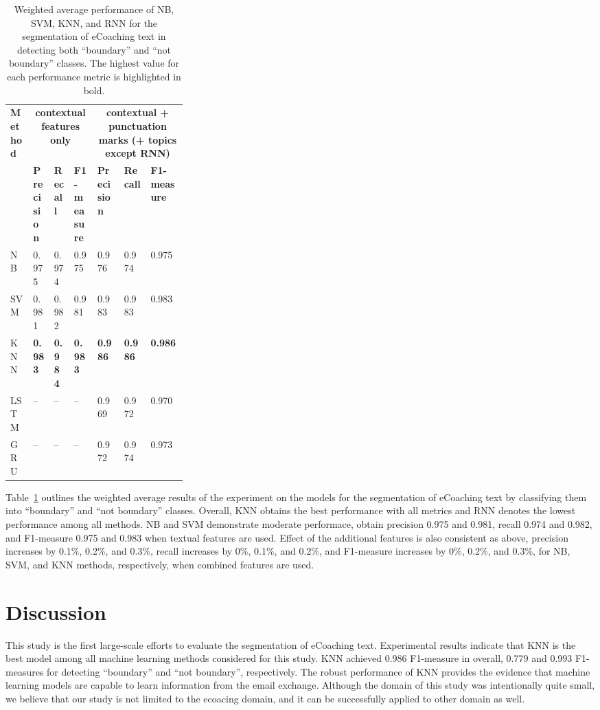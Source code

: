 \documentclass{amia}
\begin{document}
\begin{table}[ht]
\centering
\caption{Weighted average performance of NB, SVM, KNN, and RNN for the segmentation of eCoaching text in detecting both ``boundary'' and ``not boundary'' classes. The highest value for each performance metric is highlighted in bold.}
\label{tab:result_weighted_avg}
  \begin{tabular}{|l|l|l|l|p{0.15\linewidth}|p{0.15\linewidth}|l|}
  \hline
   \multirow{2}{*}{\textbf{Method}} & \multicolumn{3}{|c|}{\textbf{contextual features only}} & \multicolumn{3}{|c|}{\textbf{contextual + punctuation marks (+ topics except RNN)}} \\\cline{2-7}
   & \textbf{Precision}  & \textbf{Recall} & \textbf{F1-measure} & \textbf{Precision}  & \textbf{Recall} & \textbf{F1-measure}\\ \hline    
    
 NB & 0.975 & 0.974 & 0.975 & 0.976 & 0.974 & 0.975 \\ \hline
 SVM & 0.981 & 0.982 & 0.981 & 0.983 & 0.983 & 0.983\\ \hline
 KNN & \textbf{0.983} & \textbf{0.984} & \textbf{0.983} & \textbf{0.986} & \textbf{0.986} & \textbf{0.986}\\ \hline
 LSTM & -- & -- & -- & 0.969 & 0.972 & 0.970 \\ \hline
 GRU & -- & -- & -- & 0.972 & 0.974 & 0.973 \\ \hline 
  \end{tabular}
\end{table} 

Table~\ref{tab:result_weighted_avg} outlines the weighted average results of the experiment on the models for the segmentation of eCoaching text by classifying them into ``boundary'' and ``not boundary'' classes. Overall, KNN obtains the best performance with all metrics and RNN denotes the lowest performance among all methods. NB and SVM demonstrate moderate performace, obtain precision 0.975 and 0.981, recall 0.974 and 0.982, and F1-measure 0.975 and 0.983 when textual features are used. Effect of the additional features is also consistent as above, precision increases by 0.1\%, 0.2\%, and 0.3\%, recall increases by 0\%, 0.1\%, and 0.2\%, and F1-measure increases by 0\%, 0.2\%, and 0.3\%, for NB, SVM, and KNN methods, respectively, when combined features are used.\\

\section*{Discussion}
This study is the first large-scale efforts to evaluate the segmentation of eCoaching text. Experimental results indicate that KNN is the best model among all machine learning methods considered for this study. KNN achieved 0.986 F1-measure in overall, 0.779 and 0.993 F1-measures for detecting ``boundary'' and ``not boundary'', respectively. The robust performance of KNN provides the evidence that machine learning models are capable to learn information from the email exchange. Although the domain of this study was intentionally quite small, we believe that our study is not limited to the ecoacing domain, and it can be successfully applied to other domain as well.
\end{document}
